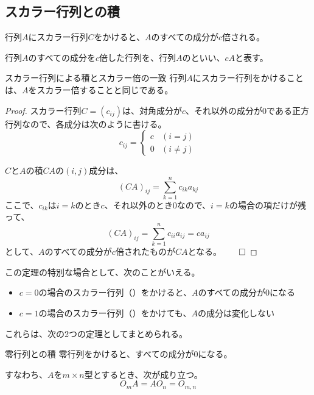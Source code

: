 \documentclass[../../../topic_linear-algebra]{subfiles}
\begin{document}
\subsection{スカラー行列との積}

行列$A$にスカラー行列$C$をかけると、$A$のすべての成分が$c$倍される。

行列$A$のすべての成分を$c$倍した行列を、行列$A$のといい、$cA$と表す。

\begin{theorem*}{スカラー行列による積とスカラー倍の一致}
  行列$A$にスカラー行列をかけることは、$A$をスカラー倍することと同じである。
\end{theorem*}

\begin{proof}
  スカラー行列$C = (c_{ij})$は、対角成分が$c$、それ以外の成分が$0$である正方行列なので、各成分は次のように書ける。
  \begin{equation*}
    c_{ij} = \begin{cases}
      c & (i = j) \\
      0 & (i \neq j)
    \end{cases}
  \end{equation*}
  
  $C$と$A$の積$CA$の$(i,j)$成分は、
  \begin{equation*}
    (CA)_{ij} = \sum_{k=1}^{n} c_{ik} a_{kj}
  \end{equation*}
  ここで、$c_{ik}$は$i=k$のとき$c$、それ以外のとき$0$なので、$i=k$の場合の項だけが残って、
  \begin{equation*}
    (CA)_{ij} = \sum_{k=1}^{n} c_{ii} a_{ij} = c a_{ij}
  \end{equation*}
  として、$A$のすべての成分が$c$倍されたものが$CA$となる。$\qed$
\end{proof}

\br

この定理の特別な場合として、次のことがいえる。
\begin{itemize}
  \item $c=0$の場合のスカラー行列（）をかけると、$A$のすべての成分が$0$になる
  \item $c=1$の場合のスカラー行列（）をかけても、$A$の成分は変化しない
\end{itemize}

これらは、次の2つの定理としてまとめられる。

\begin{theorem*}{零行列との積}
  零行列をかけると、すべての成分が0になる。
  
  すなわち、$A$を$m \times n$型とするとき、次が成り立つ。
  \begin{equation*}
    O_m A = A O_n = O_{m,n}
  \end{equation*}
\end{theorem*}
\end{document}
